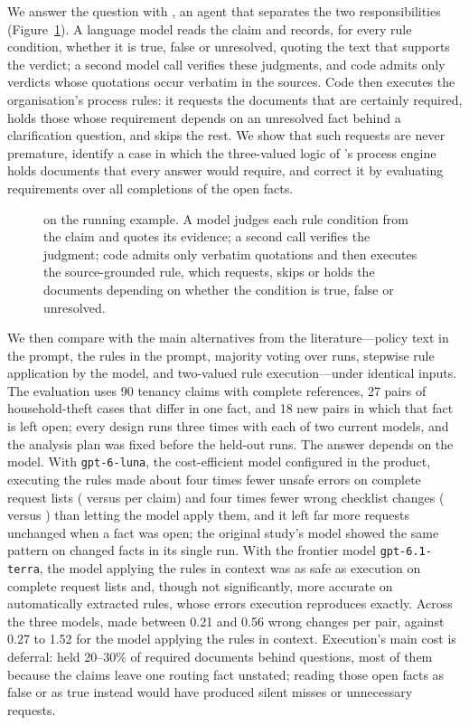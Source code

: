 We answer the question with \casepath, an agent that separates the two responsibilities (Figure~\ref{fig:overview}). A language model reads the claim and records, for every rule condition, whether it is true, false or unresolved, quoting the text that supports the verdict; a second model call verifies these judgments, and code admits only verdicts whose quotations occur verbatim in the sources. Code then executes the organisation's process rules: it requests the documents that are certainly required, holds those whose requirement depends on an unresolved fact behind a clarification question, and skips the rest. We show that such requests are never premature, identify a case in which the three-valued logic of \casepath's process engine holds documents that every answer would require, and correct it by evaluating requirements over all completions of the open facts.

\begin{figure}[t]
\centering

\caption{\casepath on the running example. A model judges each rule condition from the claim and quotes its evidence; a second call verifies the judgment; code admits only verbatim quotations and then executes the source-grounded rule, which requests, skips or holds the documents depending on whether the condition is true, false or unresolved.}
\label{fig:overview}
\end{figure}

We then compare \casepath with the main alternatives from the literature---policy text in the prompt, the rules in the prompt, majority voting over runs, stepwise rule application by the model, and two-valued rule execution---under identical inputs. The evaluation uses 90 tenancy claims with complete references, 27 pairs of household-theft cases that differ in one fact, and 18 new pairs in which that fact is left open; every design runs three times with each of two current models, and the analysis plan was fixed before the held-out runs. The answer depends on the model. With \texttt{gpt-6-luna}, the cost-efficient model configured in the \casepath product, executing the rules made about four times fewer unsafe errors on complete request lists (\tenLunaCPxUnsafe{} versus \tenLunaBoneUnsafe{} per claim) and four times fewer wrong checklist changes (\thLunaCPWrong{} versus \thLunaRWrong{}) than letting the model apply them, and it left far more requests unchanged when a fact was open; the original study's model showed the same pattern on changed facts in its single run. With the frontier model \texttt{gpt-6.1-terra}, the model applying the rules in context was as safe as execution on complete request lists and, though not significantly, more accurate on automatically extracted rules, whose errors execution reproduces exactly. Across the three models, \casepath made between 0.21 and 0.56 wrong changes per pair, against 0.27 to 1.52 for the model applying the rules in context. Execution's main cost is deferral: \casepath held 20--30\% of required documents behind questions, most of them because the claims leave one routing fact unstated; reading those open facts as false or as true instead would have produced silent misses or unnecessary requests.

